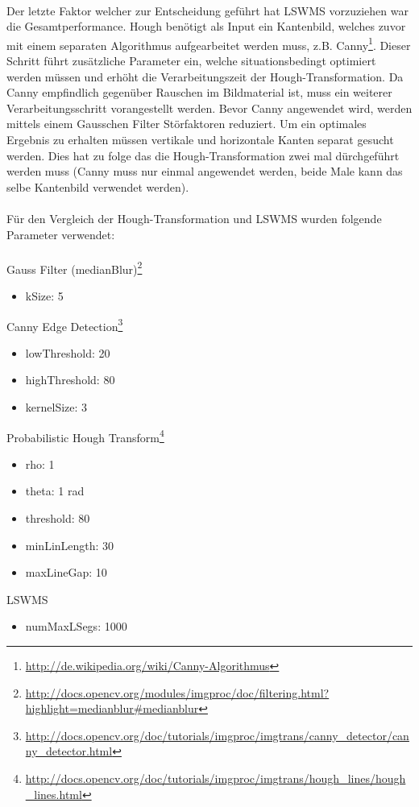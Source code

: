 \paragraph{}
Der letzte Faktor welcher zur Entscheidung geführt hat LSWMS vorzuziehen war die Gesamtperformance. Hough benötigt als Input ein Kantenbild, welches zuvor mit einem separaten Algorithmus aufgearbeitet werden muss, z.B. Canny\footnote{\protect\url{http://de.wikipedia.org/wiki/Canny-Algorithmus}}. Dieser Schritt führt zusätzliche Parameter ein, welche situationsbedingt optimiert werden müssen und erhöht die Verarbeitungszeit der Hough-Transformation. Da Canny empfindlich gegenüber Rauschen im Bildmaterial ist, muss ein weiterer Verarbeitungsschritt vorangestellt werden. Bevor Canny angewendet wird, werden mittels einem Gausschen Filter Störfaktoren reduziert. Um ein optimales Ergebnis zu erhalten müssen vertikale und horizontale Kanten separat gesucht werden. Dies hat zu folge das die Hough-Transformation zwei mal dürchgeführt werden muss (Canny muss nur einmal angewendet werden, beide Male kann das selbe Kantenbild verwendet werden).
\paragraph{}
Für den Vergleich der Hough-Transformation und LSWMS wurden folgende Parameter verwendet:
\paragraph{}
Gauss Filter (medianBlur)\footnote{\protect\url{http://docs.opencv.org/modules/imgproc/doc/filtering.html?highlight=medianblur#medianblur}}
\begin{itemize}
	\item kSize: 5
\end{itemize}
Canny Edge Detection\footnote{\protect\url{http://docs.opencv.org/doc/tutorials/imgproc/imgtrans/canny_detector/canny_detector.html}}
\begin{itemize}
	\item lowThreshold: 20
	\item highThreshold: 80
	\item kernelSize: 3
\end{itemize}
Probabilistic Hough Transform\footnote{\protect\url{http://docs.opencv.org/doc/tutorials/imgproc/imgtrans/hough_lines/hough_lines.html}}
\begin{itemize}
	\item rho: 1
	\item theta: 1 rad
	\item threshold: 80
	\item minLinLength: 30
	\item maxLineGap: 10
\end{itemize}
LSWMS
\begin{itemize}
	\item numMaxLSegs: 1000
\end{itemize}


